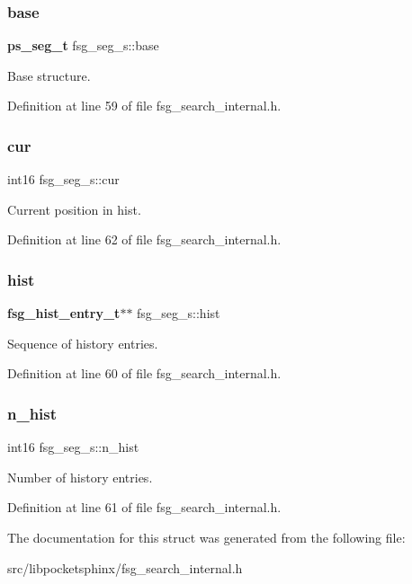\subsubsection{base}
{\footnotesize\ttfamily \textbf{ ps\+\_\+seg\+\_\+t} fsg\+\_\+seg\+\_\+s\+::base}



Base structure. 



Definition at line 59 of file fsg\+\_\+search\+\_\+internal.\+h.

\mbox{\label{structfsg__seg__s_a4b5e46bf79915c97845974e80355ebbe}} 
\subsubsection{cur}
{\footnotesize\ttfamily int16 fsg\+\_\+seg\+\_\+s\+::cur}



Current position in hist. 



Definition at line 62 of file fsg\+\_\+search\+\_\+internal.\+h.

\mbox{\label{structfsg__seg__s_ae41fbe837c6c921133c91453c58ba68e}} 
\subsubsection{hist}
{\footnotesize\ttfamily \textbf{ fsg\+\_\+hist\+\_\+entry\+\_\+t}$\ast$$\ast$ fsg\+\_\+seg\+\_\+s\+::hist}



Sequence of history entries. 



Definition at line 60 of file fsg\+\_\+search\+\_\+internal.\+h.

\mbox{\label{structfsg__seg__s_aca806a5b88f77803fff4c4c984034515}} 
\subsubsection{n\+\_\+hist}
{\footnotesize\ttfamily int16 fsg\+\_\+seg\+\_\+s\+::n\+\_\+hist}



Number of history entries. 



Definition at line 61 of file fsg\+\_\+search\+\_\+internal.\+h.



The documentation for this struct was generated from the following file\+:\begin{DoxyCompactItemize}
\item 
src/libpocketsphinx/fsg\+\_\+search\+\_\+internal.\+h\end{DoxyCompactItemize}
